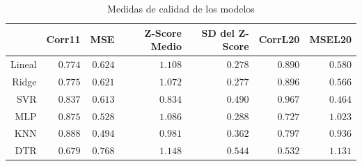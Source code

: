   \begin{table}[hbt]
  \centering
  \caption{Medidas de calidad de los modelos}\label{Tab:Quality}
  \begin{tabular}{*7{r}}
  \toprule
  & Corr11
  & MSE
  & Z-Score Medio
  & SD del Z-Score
  & CorrL20
  & MSEL20 \\ \midrule
  Lineal
  &$0.774$
  &$0.624$
  &$1.108$%
  &$0.278$
  &$0.890$
  &$0.580$\\
  Ridge
  &$0.775$
  &$0.621$
  &$1.072$
  &$0.277$
  &$0.896$
  &$0.566$ \\
  SVR
  &$0.837$
  &$0.613$
  &\boldmath$0.834$   %
  &$0.490$
  &\boldmath$0.967$
  &\boldmath$0.464$ \\
  MLP
  &$0.875$
  &$0.528$
  &$1.086$
  &$0.288$
  &$0.727$
  &$1.023$ \\
  KNN
  &\boldmath$0.888$
  &\boldmath$0.494$
  &$0.981$
  &$0.362$
  &$0.797$
  &$0.936$\\
  DTR
  &$0.679$
  &$0.768$
  &$1.148$
  &$0.544$
  &$0.532$
  &$1.131$ \\
  \bottomrule
  \end{tabular}
  \end{table}



